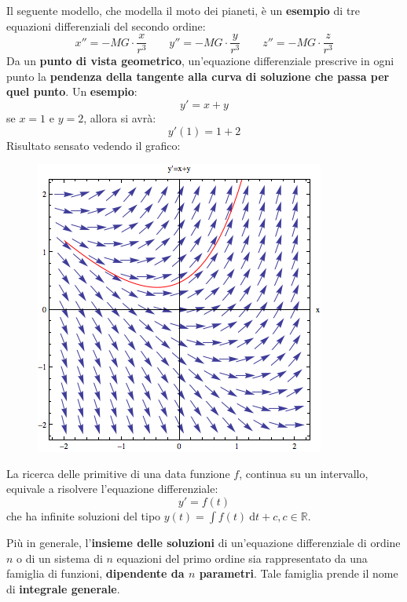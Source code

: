 \documentclass[a4paper]{article}
\newcommand{\definition}[1]{\textcolor{Red3}{\textbf{#1}}}
\newcommand{\example}[1]{\textcolor{Green4}{\textbf{#1}}}
\begin{document}
	Il seguente modello, che modella il moto dei pianeti, è un \example{esempio} di tre equazioni differenziali del secondo ordine:
	\begin{equation*}
		x'' = - MG \cdot \dfrac{x}{r^{3}} \hspace{2em}
		y'' = - MG \cdot \dfrac{y}{r^{3}} \hspace{2em}
		z'' = - MG \cdot \dfrac{z}{r^{3}} 
	\end{equation*}
	Da un \textbf{punto di vista geometrico}, un'equazione differenziale prescrive in ogni punto la \textbf{pendenza della tangente alla curva di soluzione che passa per quel punto}. Un \example{esempio}:
	\begin{equation*}
		y' = x + y
	\end{equation*}
	se $x=1$ e $y=2$, allora si avrà:
	\begin{equation*}
		y'\left(1\right) = 1 + 2
	\end{equation*}
	Risultato sensato vedendo il grafico:
	\begin{figure}[!htp]
		\centering
		\includegraphics[width=.6\textwidth]{img/significato_geometrico_eq_diff.png}
	\end{figure}

	\noindent
	La ricerca delle primitive di una data funzione $f$, continua su un intervallo, equivale a risolvere l'equazione differenziale:
	\begin{equation*}
		y'=f\left(t\right)
	\end{equation*}
	che ha infinite soluzioni del tipo $y\left(t\right) = \displaystyle\int f\left(t\right) \:\mathrm{d}t + c, c \in \mathbb{R}$.

	Più in generale, l'\textbf{insieme delle soluzioni} di un'equazione differenziale di ordine $n$ o di un sistema di $n$ equazioni del primo ordine sia rappresentato da una famiglia di funzioni, \textbf{dipendente da $n$ parametri}. Tale famiglia prende il nome di \definition{integrale generale}.\newpage
\end{document}
